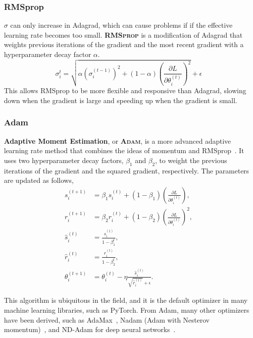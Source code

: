 \documentclass[12pt]{report}
\theoremstyle{definition}
\theoremstyle{remark}
\begin{document}
\subsubsection{RMSprop}
$\sigma$ can only increase in Adagrad, which can cause problems if if the effective learning rate becomes too small. \textbf{\textsc{RMSprop}} is a modification of Adagrad that weights previous iterations of the gradient and the most recent gradient with a hyperparameter decay factor $\alpha$.
\begin{equation}
    \sigma_i^t = \sqrt{\alpha {(\sigma_i^{(t-1)})}^2 + (1-\alpha)\left(\frac{\partial L}{\partial \theta_i^{(t)}}\right)^2} + \epsilon
\end{equation}
This allows RMSprop to be more flexible and responsive than Adagrad, slowing down when the gradient is large and speeding up when the gradient is small.

\subsubsection{Adam}
\textbf{Adaptive Moment Estimation}, or \textbf{\textsc{Adam}}, is a more advanced adaptive learning rate method that combines the ideas of momentum and RMSprop~\cite{kingma_adam_2017, bishop_deep_2023}. It uses two hyperparameter decay factors, $\beta_1$ and $\beta_2$, to weight the previous iterations of the gradient and the squared gradient, respectively. The parameters are updated as follows,
\begin{align}
    s_i^{(t+1)} &= \beta_1 s_i^{(t)} + (1-\beta_1) \left(\frac{\partial L}{\partial \theta_i^{(t)}}\right), \\
    r_i^{(t+1)} &= \beta_2 r_i^{(t)} + (1-\beta_2) \left(\frac{\partial L}{\partial \theta_i^{(t)}}\right)^2, \\
    \hat{s}_i^{(t)} &= \frac{s_i^{(t)}}{1-\beta_1^{t}}, \\
    \hat{r}_i^{(t)} &= \frac{r_i^{(t)}}{1-\beta_2^{t}}, \\
    \theta_i^{(t+1)} &= \theta_i^{(t)} - \eta \frac{\hat{s}_i^{(t)}}{\sqrt{\hat{r}_i^{(t)}} + \epsilon}.
\end{align}

This algorithm is ubiquitous in the field, and it is the default optimizer in many machine learning libraries, such as PyTorch. From Adam, many other optimizers have been derived, such as AdaMax~\cite{kingma_adam_2017}, Nadam (Adam with Nesterov momentum)~\cite{dozat_incorporating_2016}, and ND-Adam for deep neural networks~\cite{zhang_improved_2018}.
\end{document}
